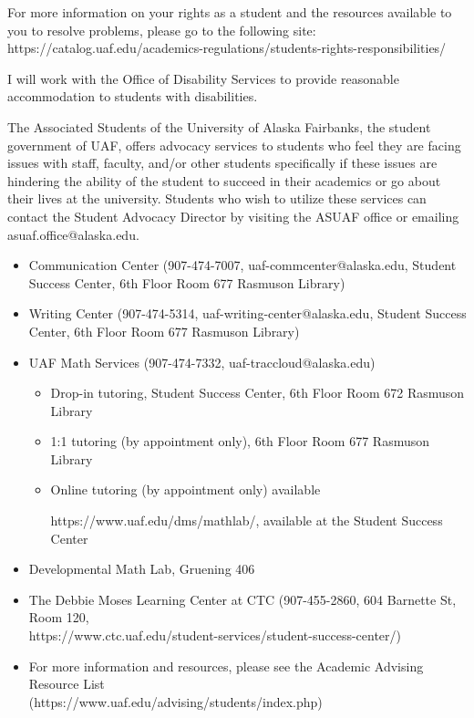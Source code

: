 \documentclass[12pt]{article}
\begin{document}
    For more information on your rights as a student and the resources available to you to resolve problems, please go to the following site:\\ {https://catalog.uaf.edu/academics-regulations/students-rights-responsibilities/}
    
     I will work with the Office of Disability Services to provide reasonable accommodation to students with disabilities.
    
     The Associated Students of the University of Alaska Fairbanks, the student government of UAF, offers advocacy services to students who feel they are facing issues with staff, faculty, and/or other students specifically if these issues are hindering the ability of the student to succeed in their academics or go about their lives at the university. Students who wish to utilize these services can contact the Student Advocacy Director by visiting the ASUAF office or emailing asuaf.office@alaska.edu. 
    
    
    
    \begin{itemize}
    \setlength\itemsep{0em}
            \item Communication Center (907-474-7007, {uaf-commcenter@alaska.edu}, Student Success Center, 6th Floor Room 677 Rasmuson Library)
            \item Writing Center (907-474-5314, {uaf-writing-center@alaska.edu}, Student Success Center, 6th Floor Room 677 Rasmuson Library)
    \item UAF Math Services (907-474-7332, {uaf-traccloud@alaska.edu})
    
    
    \begin{itemize}
    \item Drop-in tutoring, Student Success Center, 6th Floor Room 672 Rasmuson Library
    
    \item 1:1 tutoring (by appointment only), 6th Floor Room 677 Rasmuson Library
    
    \item Online tutoring (by appointment only) available
    
    https://www.uaf.edu/dms/mathlab/, available at the Student Success Center
    \end{itemize}
    
    \item Developmental Math Lab, Gruening 406
    \item The Debbie Moses Learning Center at CTC (907-455-2860, 604 Barnette St, Room 120,\\ {https://www.ctc.uaf.edu/student-services/student-success-center/})
    \item For more information and resources, please see the Academic Advising Resource List \\({https://www.uaf.edu/advising/students/index.php})
    \end{itemize}
    
\end{document}
